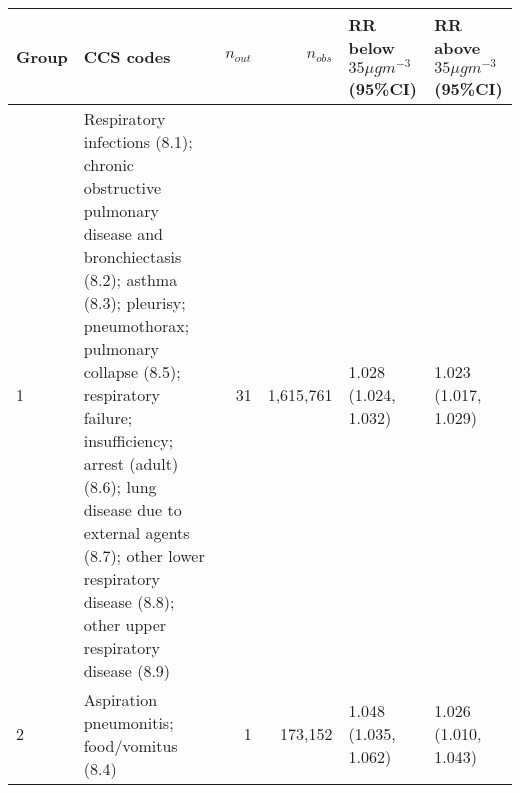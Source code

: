 \begin{tabular}{lp{7.6cm}rrp{2.2cm}p{2.2cm}}
  \hline
Group & CCS codes & $n_{out}$ & $n_{obs}$ & RR below $35 \mu g m^{-3}$ (95\%CI) & RR above $35 \mu g m^{-3}$ (95\%CI) \\ 
  \hline
   1 & Respiratory infections (8.1); chronic obstructive pulmonary disease and bronchiectasis (8.2); asthma (8.3); pleurisy; pneumothorax; pulmonary collapse (8.5); respiratory failure; insufficiency; arrest (adult) (8.6); lung disease due to external agents (8.7); other lower respiratory disease (8.8); other upper respiratory disease (8.9) &   31 & 1,615,761 & 1.028 (1.024, 1.032) & 1.023 (1.017, 1.029) \\ 
     2 & Aspiration pneumonitis; food/vomitus (8.4) &    1 & 173,152 & 1.048 (1.035, 1.062) & 1.026 (1.010, 1.043) \\ 
   \hline
\end{tabular}


